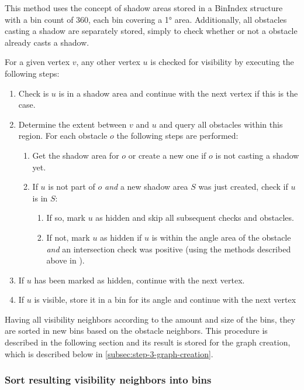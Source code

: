 				This method uses the concept of shadow areas stored in a BinIndex structure with a bin count of 360, each bin covering a 1° area.
				Additionally, all obstacles casting a shadow are separately stored, simply to check whether or not a obstacle already casts a shadow.
				
				For a given vertex $v$, any other vertex $u$ is checked for visibility by executing the following steps:
				\begin{enumerate}
					\item Check is $u$ is in a shadow area and continue with the next vertex if this is the case.
					\item Determine the extent between $v$ and $u$ and query all obstacles within this region. For each obstacle $o$ the following steps are performed:
					\begin{enumerate}
						\item Get the shadow area for $o$ or create a new one if $o$ is not casting a shadow yet.
						\item If $u$ is not part of $o$ \emph{and} a new shadow area $S$ was just created, check if $u$ is in $S$:
						\begin{enumerate}
							\item If so, mark $u$ as hidden and skip all subsequent checks and obstacles.
							\item If not, mark $u$ as hidden if $u$ is within the angle area of the obstacle \emph{and} an intersection check was positive (using the methods described above in \emph{}).
						\end{enumerate}
					\end{enumerate}
					\item If $u$ has been marked as hidden, continue with the next vertex.
					\item If $u$ is visible, store it in a bin for its angle and continue with the next vertex
				\end{enumerate}
				
			
				Having all visibility neighbors according to the amount and size of the bins, they are sorted in new bins based on the obstacle neighbors.
				This procedure is described in the following section and its result is stored for the graph creation, which is described below in \cref{subsec:step-3-graph-creation}.
			
			\subsubsection{Sort resulting visibility neighbors into bins}
			
